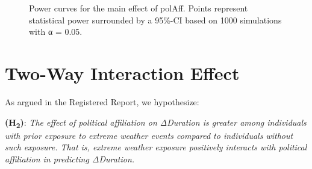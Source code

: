 \documentclass[
  letterpaper,
  DIV=11,
  numbers=noendperiod]{scrartcl}
\begin{document}
\begin{figure}


\caption{\label{fig-powC-mainEffect}Power curves for the main effect of
polAff. Points represent statistical power surrounded by a 95\%-CI based
on 1000 simulations with α = 0.05.}

\end{figure}%

\section{Two-Way Interaction Effect}\label{two-way-interaction-effect}

As argued in the Registered Report, we hypothesize:

\textbf{(H\textsubscript{2})}: \emph{The effect of political affiliation
on ΔDuration is greater among individuals with prior exposure to extreme
weather events compared to individuals without such exposure. That is,
extreme weather exposure positively interacts with political affiliation
in predicting ΔDuration.}
\end{document}
